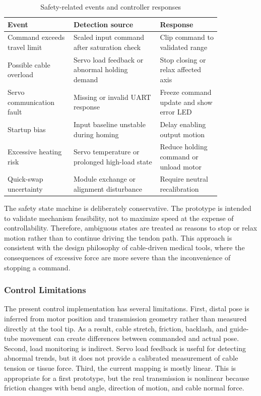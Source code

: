 \begin{table}[htbp]
    \centering
    \caption{Safety-related events and controller responses}
    \label{tab:safety_events}
    \begin{tabular}{p{0.26\linewidth} p{0.34\linewidth} p{0.24\linewidth}}
        \toprule
        Event & Detection source & Response \\
        \midrule
        Command exceeds travel limit & Scaled input command after saturation check & Clip command to validated range \\
        Possible cable overload & Servo load feedback or abnormal holding demand & Stop closing or relax affected axis \\
        Servo communication fault & Missing or invalid UART response & Freeze command update and show error LED \\
        Startup bias & Input baseline unstable during homing & Delay enabling output motion \\
        Excessive heating risk & Servo temperature or prolonged high-load state & Reduce holding command or unload motor \\
        Quick-swap uncertainty & Module exchange or alignment disturbance & Require neutral recalibration \\
        \bottomrule
    \end{tabular}
\end{table}

The safety state machine is deliberately conservative. The prototype is intended to validate mechanism feasibility, not to maximize speed at the expense of controllability. Therefore, ambiguous states are treated as reasons to stop or relax motion rather than to continue driving the tendon path. This approach is consistent with the design philosophy of cable-driven medical tools, where the consequences of excessive force are more severe than the inconvenience of stopping a command.

\subsubsection{Control Limitations}
The present control implementation has several limitations. First, distal pose is inferred from motor position and transmission geometry rather than measured directly at the tool tip. As a result, cable stretch, friction, backlash, and guide-tube movement can create differences between commanded and actual pose. Second, load monitoring is indirect. Servo load feedback is useful for detecting abnormal trends, but it does not provide a calibrated measurement of cable tension or tissue force. Third, the current mapping is mostly linear. This is appropriate for a first prototype, but the real transmission is nonlinear because friction changes with bend angle, direction of motion, and cable normal force.

